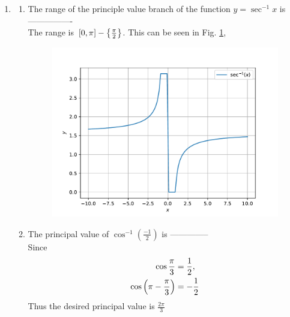 \documentclass[journal,12pt,twocolumn]{IEEEtran}
\renewcommand\thesection{\arabic{section}}
\begin{document}
\begin{enumerate}[label=\thesection.\arabic*.,ref=\thesection.\theenumi]
\item \begin{enumerate} \item The range of the principle value branch of the function $ y= \sec^{-1}x $ is ----------------
			\\
			\solution The range is ${}\left[0,\pi\right] - \left\{\frac{\pi}{2}\right\}$.
This can be seen in Fig. 
	\ref{fig:cont-12-12},
\begin{figure}[!ht]
	\centering
	\includegraphics[width=\columnwidth]{figs/cont-12-12.pdf}
	\caption{}
	\label{fig:cont-12-12}
\end{figure}
    
\item The principal value of $\cos^{-1} \left(\frac{-1}{2}\right)$ is --------------\\
	\solution Since
		\begin{align}
			\cos \frac{\pi}{3} &= \frac{1}{2},
			\\
			\cos \left(\pi - \frac{\pi}{3}\right) &= -\frac{1}{2}
		\end{align}
		Thus the desired principal value is $\frac{2\pi}{3}$
\end{enumerate}


\end{enumerate}
\end{document}

